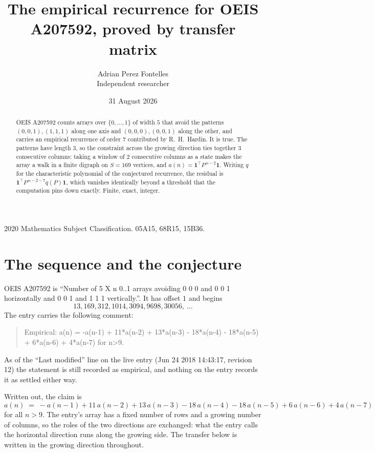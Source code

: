 \documentclass[11pt,a4paper]{article}
\title{The empirical recurrence for OEIS A207592, proved by transfer matrix}
\author{Adrian Perez Fontelles\\ \small Independent researcher}
\date{31 August 2026}
\theoremstyle{plain}
\theoremstyle{definition}
\begin{document}
\maketitle

\begin{abstract}
OEIS A207592 counts arrays over $\{0,\dots,1\}$ of width $5$ that avoid the patterns
$(0,0,1), (1,1,1)$ along one axis and $(0,0,0), (0,0,1)$ along the other, and carries an empirical recurrence of
order $7$ contributed by R.~H.~Hardin. It is true. The patterns have length $3$, so
the constraint across the growing direction ties together $3$ consecutive columns: taking a
window of $2$ consecutive columns as a state makes the array a walk in a finite digraph
on $S=169$ vertices, and $a(n)=\mathbf{1}^{\!\top}P^{\,n-2}\mathbf{1}$. Writing $q$
for the characteristic polynomial of the conjectured recurrence, the residual is
$\mathbf{1}^{\!\top}P^{\,n-2-7}q(P)\mathbf{1}$, which vanishes identically
beyond a threshold that the computation pins down exactly. Finite, exact, integer.
\end{abstract}

\noindent\small 2020 Mathematics Subject Classification. 05A15, 68R15, 15B36.\normalsize

\section{The sequence and the conjecture}

OEIS A207592 is ``Number of 5 X n 0..1 arrays avoiding 0 0 0 and 0 0 1 horizontally and 0 0 1 and 1 1 1 vertically.''. It has offset
$1$ and begins
\[
13, 169, 312, 1014, 3094, 9698, 30056,\ \dots
\]
The entry carries the following comment:
\begin{quote}\small
Empirical: a(n) = -a(n-1) + 11*a(n-2) + 13*a(n-3) - 18*a(n-4) - 18*a(n-5) + 6*a(n-6) + 4*a(n-7) for n>9.
\end{quote}
As of the ``Last modified'' line on the live entry (Jun 24 2018 14:43:17, revision
12) the statement is still recorded as empirical, and nothing on the entry
records it as settled either way.

Written out, the claim is
\begin{equation}\label{eq:conj}
a(n)\;=\;-a(n-1) + 11\,a(n-2) + 13\,a(n-3) - 18\,a(n-4) - 18\,a(n-5) + 6\,a(n-6) + 4\,a(n-7)
\end{equation}
for all $n>9$. The entry's array has a fixed number of rows and a growing number of
columns, so the roles of the two directions are exchanged: what the entry calls the
horizontal direction runs along the growing side. The transfer below is written in the
growing direction throughout.
\end{document}
